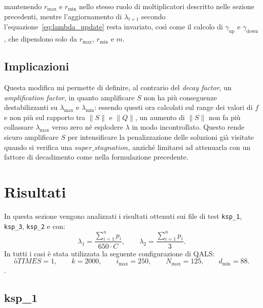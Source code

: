 \documentclass[12pt, letterpaper]{article}
\begin{document}
mantenendo \(r_{\max}\) e \(r_{\min}\) nello stesso ruolo di moltiplicatori descritto nelle sezione precedenti,
mentre l'aggiornamento di \(\lambda_{t+1}\) secondo l'equazione~\eqref{eq:lambda_update} resta invariato,
così come il calcolo di \(\gamma_{\text{up}}\) e \(\gamma_{\text{down}}\), che dipendono solo
da \(r_{\max}\), \(r_{\min}\) e \(m\).

\subsection{Implicazioni}

Questa modifica mi permette di definire, al contrario del \emph{decay factor}, un
\emph{amplification factor}, in quanto amplificare \(S\) non ha più conseguenze
destabilizzanti su \(\lambda_{\max}\) e \(\lambda_{\min}\): essendo questi ora calcolati
sul range dei valori di \(f\) e non più sul rapporto tra $\|S\|$ e $\|Q\|$, un aumento di $\|S\|$ 
non fa più collassare \(\lambda_{\max}\) verso zero né esplodere \(\lambda\) in modo incontrollato. 
Questo rende sicuro amplificare \(S\) per intensificare la penalizzazione delle 
soluzioni già visitate quando si verifica una \(super\_stagnation\), anziché limitarsi ad attenuarla
con un fattore di decadimento come nella formulazione precedente.

\section{Risultati}

In questa sezione vengono analizzati i risultati ottenuti sui file di test
\texttt{ksp\_1}, \texttt{ksp\_3}, \texttt{ksp\_2} e con:
\[
\lambda_1 = \frac{\sum_{i=1}^{n} p_i}{650 \cdot C}, 
\qquad
\lambda_2 = \frac{\sum_{i=1}^{n} p_i}{3}.
\]
In tutti i casi è stata utilizzata la seguente
configurazione di QALS:
\[ò
TIMES = 1, \qquad
k = 2000, \qquad
i_{\max} = 250, \qquad
N_{\max} = 125, \qquad
d_{\min} = 88.
\].

\clearpage
\subsection{ksp\_1}
\end{document}
